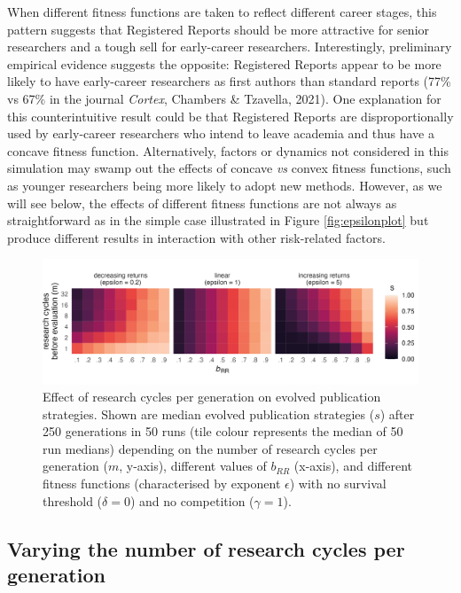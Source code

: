 \documentclass[
  ,man,mask,floatsintext]{apa6}
\begin{document}
When different fitness functions are taken to reflect different career stages,
this pattern suggests that Registered Reports should be more attractive for senior researchers and a tough sell for early-career researchers.
Interestingly, preliminary empirical evidence suggests the opposite:
Registered Reports appear to be more likely to have early-career researchers as first authors than standard reports (77\% vs 67\% in the journal \emph{Cortex}, Chambers \& Tzavella, 2021).
One explanation for this counterintuitive result could be that Registered Reports are disproportionally used by early-career researchers who intend to leave academia and thus have a concave fitness function.
Alternatively, factors or dynamics not considered in this simulation may swamp out the effects of concave \emph{vs} convex fitness functions, such as younger researchers being more likely to adopt new methods.
However, as we will see below, the effects of different fitness functions are not always as straightforward as in the simple case illustrated in Figure \ref{fig:epsilonplot} but produce different results in interaction with other risk-related factors.



\begin{figure}

{\centering \includegraphics[width=1\linewidth]{plots/plot_m_evo_rocket} 

}

\caption{Effect of research cycles per generation on evolved publication strategies. Shown are median evolved publication strategies (\(s\)) after 250 generations in 50 runs (tile colour represents the median of 50 run medians) depending on the number of research cycles per generation (\(m\), y-axis), different values of \(b_{RR}\) (x-axis), and different fitness functions (characterised by exponent \(\epsilon\)) with no survival threshold (\(\delta = 0\)) and no competition (\(\gamma = 1\)).}\label{fig:mplot}
\end{figure}

\hypertarget{varying-the-number-of-research-cycles-per-generation}{%
\subsection{Varying the number of research cycles per generation}\label{varying-the-number-of-research-cycles-per-generation}}
\end{document}
